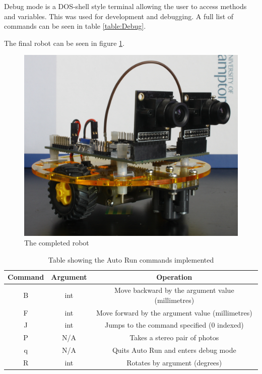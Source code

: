 Debug mode is a DOS-shell style terminal allowing the user to access methods and variables. This was used for development and debugging. A full list of commands can be seen in table \ref{table:Debug}. 

The final robot can be seen in figure \ref{fig:Robot:Complete}.

\begin{figure}
\includegraphics[width=\textwidth]{Figures/Robot.jpg}
\caption{The completed robot}
\label{fig:Robot:Complete}
\end{figure}

\begin{table}
\centering
\caption{Table showing the Auto Run commands implemented}
\label{table:AutoRun}
\begin{tabular}{ccc}\toprule
Command & 	Argument 			& 	Operation \\\toprule
B		&	int					&	Move backward by the argument value (millimetres) \\\midrule
F		&	int 				&	Move forward by the argument value (millimetres)\\\midrule
J		&	int					&	Jumps to the command specified (0 indexed)\\\midrule
P		&	N/A					&	Takes a stereo pair of photos\\\midrule
q		&	N/A					&	Quits Auto Run and enters debug mode\\\midrule
R		& 	int 			 	&	Rotates by argument (degrees)\\ \bottomrule
\end{tabular}
\end{table}

